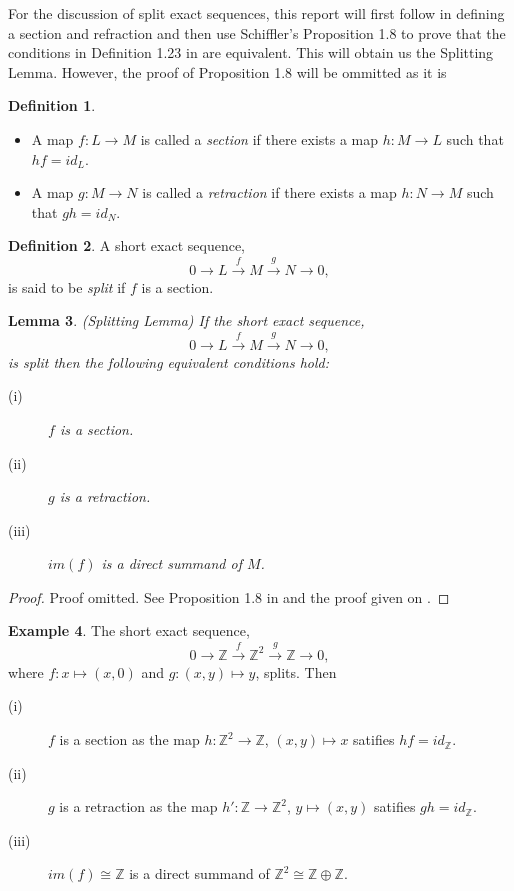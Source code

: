 \documentclass[11.5pt, twoside, a4paper, titlepage]{report}
\providecommand{\bb}[1]{\mathbb{#1}}
\theoremstyle{definition}
\newtheorem{mydef}{Definition}[section]
\newtheorem{eg}[mydef]{Example}
\theoremstyle{plain}
\newtheorem{lem}[mydef]{Lemma}
\begin{document}
For the discussion of split exact sequences, this report will first follow \cite{Schiff} in defining a section and refraction and then use Schiffler's Proposition 1.8 to prove that the conditions in Definition 1.23 in \cite{CB1} are equivalent. This will obtain us the Splitting Lemma. However, the proof of Proposition 1.8 will be ommitted as it is 

\begin{mydef} \label{secretdef}
\begin{itemize}
\item A map $f: L \to M$ is called a \emph{section} if there exists a map $h: M \to L$ such that $hf=id_L$.
\item A map $g:M\to N$ is called a \emph{retraction} if there exists a map $h: N \to M$ such that $gh=id_N$.
\end{itemize}
\end{mydef}

\begin{mydef}
A short exact sequence,
\begin{equation*}
0\xrightarrow{}L\xrightarrow{f} M \xrightarrow{g} N \xrightarrow{} 0,
\end{equation*}
is said to be \emph{split} if $f$ is a section.
\end{mydef}

\begin{lem} \label{splittinglem} (Splitting Lemma)
If the short exact sequence, 
\begin{equation*}
0\xrightarrow{}L\xrightarrow{f} M \xrightarrow{g} N \xrightarrow{} 0,
\end{equation*}
is split then the following equivalent conditions hold:
\begin{description}
\item [(i)] $f$ is a section.
\item [(ii)] $g$ is a retraction.
\item [(iii)] $im(f)$ is a direct summand of $M$.
\end{description}
\end{lem}
\begin{proof}
Proof omitted. See Proposition 1.8 in \cite{Schiff} and the proof given on \cite{Splittinglem}.
\end{proof}

\begin{eg}
The short exact sequence, 
\begin{equation*}
0 \xrightarrow{}\bb{Z} \xrightarrow{f} \bb{Z}^2 \xrightarrow{g} \bb{Z} \xrightarrow{} 0,
\end{equation*}
where $f: x \mapsto (x, 0)$ and $g: (x, y) \mapsto y$, splits. Then
\begin{description}
\item [(i)] $f$ is a section as the map $h:\bb{Z}^2 \to \bb{Z}$, $(x, y) \mapsto x$ satifies $hf=id_{\bb{Z}}$.
\item [(ii)] $g$ is a retraction as the map $h': \bb{Z} \to \bb{Z}^2$, $y \mapsto (x, y)$ satifies $gh=id_{\bb{Z}}$.
\item [(iii)] $im(f) \cong \bb{Z}$ is a direct summand of $\bb{Z}^2 \cong \bb{Z}\oplus \bb{Z}$.
\end{description}
\end{eg}
\end{document}
